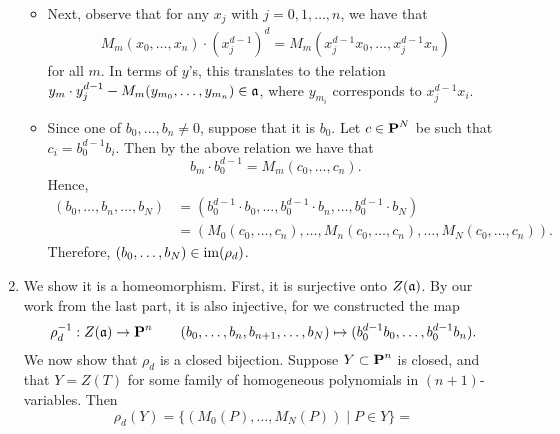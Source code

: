 \documentclass[10pt]{amsart}
\begin{document}
\begin{solution}
\begin{luke}
\begin{enumerate}
\begin{itemize}
                \item Next, observe that for any $x_j$ with 
                $j = 0, 1, \dots, n$, we have that
                \begin{align*}
                    M_m(x_0, \dots, x_n)\cdot (x_j^{d-1})^{d}
                    =
                    M_m(x_j^{d-1}x_0, \dots, x_j^{d-1}x_n)
                \end{align*}
                for all $m$.
                In terms of $y$'s, this translates to the relation 
                $y_m \cdot y_j^{d-1}- M_m(y_{m_0}, \dots, y_{m_n}) \in \mathfrak{a}$, 
                where $y_{m_i}$ corresponds to $x_j^{d-1}x_i$.

                \item Since one of $b_0, \dots, b_n \ne 0$, suppose that it is $b_0$. 
                Let $c \in \operatorname{\mathbf{P}}^N$ be such that $c_i = b_0^{d-1}b_i$. 
                Then by the above relation we have that 
                \[
                    b_m\cdot b_0^{d-1} = M_m(c_0, \dots, c_n).
                \]
                Hence, 
                \begin{align*}
                    (b_0, \dots, b_n, \dots, b_N) 
                    &=
                    (b_0^{d-1}\cdot b_0, \dots, b_0^{d-1} \cdot b_n, \dots, b_0^{d-1} \cdot b_N)\\
                    &=
                    (M_0(c_0, \dots, c_n), \dots, M_n(c_0, \dots, c_n), \dots, M_N(c_0, \dots, c_n)).
                \end{align*}
                Therefore, $(b_0, \dots, b_N) \in \operatorname{im}(\rho_d)$. 
    
            \end{itemize}
            
        \item We show it is a homeomorphism. First, it is surjective onto $Z(\mathfrak{a})$. 
        By our work from the last part, it is also injective, for we constructed the map 
        \[
            \rho_d^{-1}: Z(\mathfrak{a}) \to \operatorname{\mathbf{P}}^n \qquad (b_0, \dots, b_n, b_{n+1}, \dots, b_N) \mapsto (b_0^{d-1}b_0, \dots, b_0^{d-1}b_n).
        \]
        We now show that $\rho_d$ is a closed bijection. Suppose $Y \subset \operatorname{\mathbf{P}}^n$ is closed, and that 
        $Y = Z(T)$ for some family of homogeneous polynomials in $(n+1)$-variables. 
        Then 
        \[
            \rho_d(Y) = \bigg\{ (M_0(P), \dots, M_N(P)) \;\bigg|\; P \in Y \bigg\} 
            =
        \]
        \end{enumerate}
    \end{luke}
\end{solution}
\end{document}
